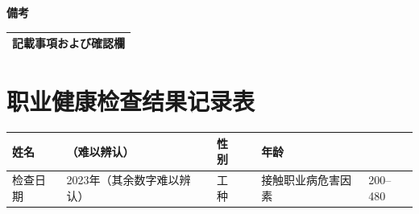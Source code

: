 \documentclass[UTF8,10pt,a4paper,fontset=fandol]{ctexart}
\newcommand{\fieldvalue}[1]{#1}
\newcommand{\handwritten}[1]{#1}
\begin{document}
\vspace{0.5em}

\noindent
\textbf{備考}\\
\noindent
\begin{tabularx}{\textwidth}{|X|}
\hline
記載事項および確認欄\\[5em]
\hline
\end{tabularx}


\newpage

\section*{职业健康检查结果记录表}


\begin{tabularx}{\textwidth}{|l|X|l|X|l|X|}
\hline
姓名 & 
\fieldvalue{\handwritten{（难以辨认）}} &
性别 & & 年龄 & \\
\hline
检查日期 &
\fieldvalue{\handwritten{2023年（其余数字难以辨认）}} &
工种 & & 接触职业病危害因素 & 200--480 \\
\hline
\end{tabularx}

\vspace{0.5em}
\end{document}
